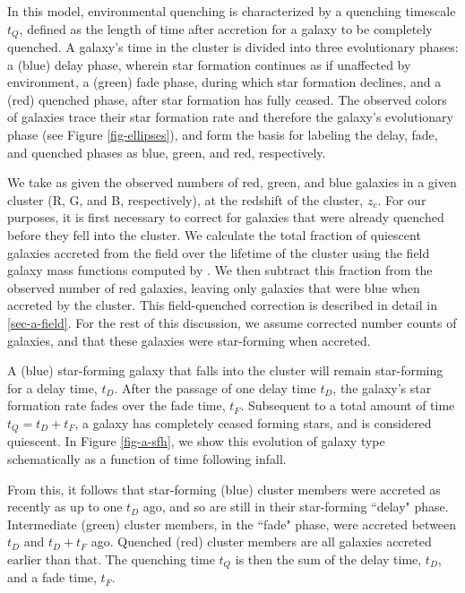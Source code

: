 In this model, environmental quenching is characterized by a quenching timescale $t_Q$, defined as the length of time after accretion for a galaxy to be completely quenched.
A galaxy's time in the cluster is divided into three evolutionary phases: a (blue) delay phase, wherein star formation continues as if unaffected by environment, a (green) fade phase, during which star formation declines, and a (red) quenched phase, after star formation has fully ceased.
The observed colors of galaxies trace their star formation rate and therefore the galaxy's evolutionary phase (see Figure \ref{fig-ellipses}), and form the basis for labeling the delay, fade, and quenched phases as blue, green, and red, respectively.

We take as given the observed numbers of red, green, and blue galaxies in a given cluster (R, G, and B, respectively), at the redshift of the cluster, $z_c$.
For our purposes, it is first necessary to correct for galaxies that were already quenched before they fell into the cluster.
We calculate the total fraction of quiescent galaxies accreted from the field over the lifetime of the cluster using the field galaxy mass functions computed by \citet{Muzzin:2013ab}.
We then subtract this fraction from the observed number of red galaxies, leaving only galaxies that were blue when accreted by the cluster.
This field-quenched correction is described in detail in \ref{sec-a-field}.
For the rest of this discussion, we assume corrected number counts of galaxies, and that these galaxies were star-forming when accreted.

A (blue) star-forming galaxy that falls into the cluster will remain star-forming for a delay time, $t_D$.
After the passage of one delay time $t_D$, the galaxy's star formation rate fades over the fade time, $t_F$.
Subsequent to a total amount of time $t_Q = t_D + t_F$, a galaxy has completely ceased forming stars, and is considered quiescent.
In Figure \ref{fig-a-sfh}, we show this evolution of galaxy type schematically as a function of time following infall.

From this, it follows that star-forming (blue) cluster members were accreted as recently as up to one $t_D$ ago, and so are still in their star-forming ``delay" phase.
Intermediate (green) cluster members, in the ``fade" phase, were accreted between $t_D$ and $t_D + t_F$ ago.
Quenched (red) cluster members are all galaxies accreted earlier than that.
The quenching time $t_Q$ is then the sum of the delay time, $t_D$, and a fade time, $t_F$.

